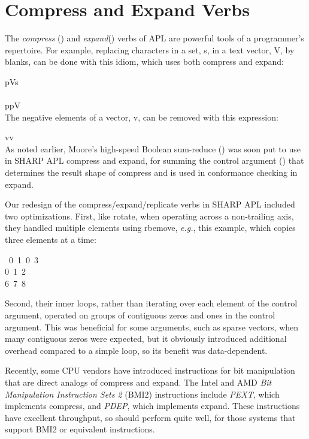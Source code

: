 \section{Compress and Expand Verbs}
\label{compressexpand}

The {\em compress} ({\apl \qalpha\qslash\qomega}) and
{\em expand}({\apl \qalpha\qbslash\qomega}) verbs of APL
are powerful tools of a programmer's repertoire.
For example, replacing characters in a set, {\apl s},
in a text vector, {\apl V}, by blanks, can be done with 
this idiom, which uses both compress and expand:

\medskip
{\apl p\qlarrow\0V\qeps\0s\\
~\\
  p\qbslash\0p\qslash\0V}\\

\noindent The negative elements of a vector, {\apl v},
can be removed with this expression:

{\apl \qlpar\0v\qlt{}\qrpar\qslash\0v}\\

As noted earlier, Moore's high-speed Boolean 
sum-reduce ({\apl \qplus\qslash\qomega}) was
soon put to use in SHARP APL compress and expand, for summing the
control argument ({\apl \qalpha}) that determines the result shape
of compress and is used in conformance checking in expand.

Our redesign of the compress/expand/replicate verbs in SHARP APL
included two optimizations.
First, like rotate, when
operating across a non-trailing axis, they handled
multiple elements using rbemove, {\em e.g.}, this example,
which copies three elements at a time:

\medskip
{~0~1~0\qslashf{}~3\qrho\qiota{}\\
0~1~2\\
6~7~8\\}

\noindent Second, their inner loops, rather than
iterating over each element of the control argument,
operated on groups of contiguous zeros and ones in 
the control argument. This was beneficial for some
arguments, such as sparse vectors, when many contiguous zeros
were expected, but it obviously introduced additional
overhead compared to a simple loop, so its benefit was data-dependent.

Recently, some CPU vendors have introduced instructions
for bit manipulation that are direct analogs of compress and expand.
The Intel and AMD {\em Bit Manipulation Instruction Sets 2} (BMI2) 
instructions
include {\em PEXT}, which implements compress, and
{\em PDEP}, which implements expand.
These instructions have excellent throughput, so should
perform quite well, for those systems that support BMI2 or
equivalent instructions.


